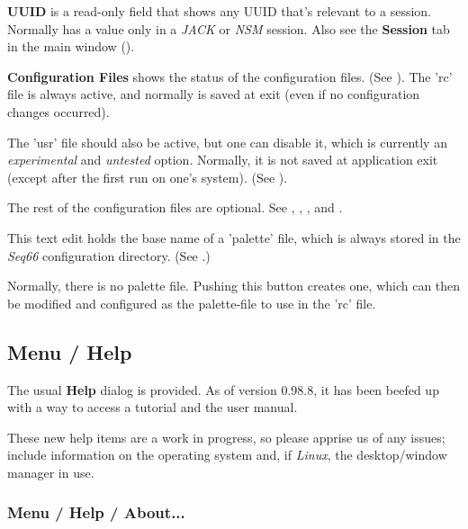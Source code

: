    \textbf{UUID} is a read-only field that shows any UUID that's relevant to a
   session. Normally has a value only in a \textsl{JACK} or
   \textsl{NSM} session.
   Also see the \textbf{Session} tab in the main window
   ().

   \textbf{Configuration Files}
   shows the status of the configuration files.
   (See ).
   The 'rc' file is always active, and normally is saved at exit (even if no
   configuration changes occurred).

   The 'usr' file should also be active, but one can disable it, which is
   currently an \textsl{experimental} and \textsl{untested} option.
   Normally, it is not saved at application exit (except after the first run on
   one's system).
   (See ).

   The rest of the configuration files are optional.
   See
   ,
   ,
   , and
   .

   This text edit holds the base name of a 'palette' file, which is always
   stored in the \textsl{Seq66} configuration directory.
   (See .)

   Normally, there is no palette file.  Pushing this button creates one, which
   can then be modified and configured as the palette-file to use in the 'rc'
   file.

\subsection{Menu / Help}
\label{subsec:menu_help}

   The usual \textbf{Help} dialog is provided.
   As of version 0.98.8, it has been beefed up with a way to access a
   tutorial and the user manual.

   These new help items are a work in progress, so please apprise
   us of any issues; include information on the operating system and,
   if \textsl{Linux}, the desktop/window manager in use.

\subsubsection{Menu / Help / About...}
\label{subsubsec:menu_help_about}

